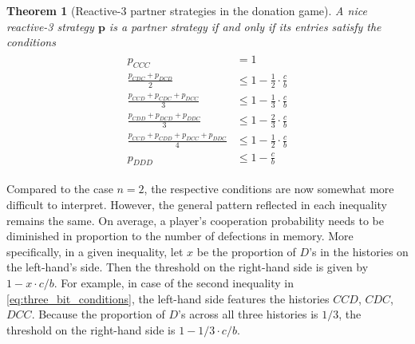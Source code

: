 \documentclass[9pt,twoside,lineno]{pnas-new}
\theoremstyle{plainCl1}
\newtheorem{theorem}{Theorem}
\newtheorem{corollary}{Corollary}
\theoremstyle{plainCl2}
\begin{document}
\begin{theorem}[Reactive-3 partner strategies in the donation game]\label{theorem:reactive_three_partner_strategies}
A nice reactive-3 strategy $\mathbf{p}$ is a partner strategy if and only if its entries satisfy the conditions
\begin{align}\label{eq:three_bit_conditions}
  \begin{split}
  p_{CCC} & = 1 \\
  \frac{p_{CDC} + p_{DCD}}{2} & \leq 1 - \frac{1}{2} \cdot \frac{c}{b} \\
  \frac{p_{CCD} + p_{CDC} + p_{DCC}}{3} & \leq 1 - \frac{1}{3} \cdot \frac{c}{b} \\
  \frac{p_{CDD} + p_{DCD} + p_{DDC}}{3} & \leq 1 - \frac{2}{3} \cdot \frac{c}{b} \\
  \frac{p_{CCD} + p_{CDD} + p_{DCC} + p_{DDC}}{4}  & \leq 1 - \frac{1}{2} \cdot \frac{c}{b}  \\
  p_{DDD} & \leq 1\!-\! \frac{c}{b}
  \end{split}
\end{align}
\end{theorem}

\noindent
Compared to the case $n\!=\!2$, the respective conditions are now somewhat more difficult to interpret. 
However, the general pattern reflected in each inequality remains the same. 
On average, a player's cooperation probability needs to be diminished in proportion to the number of defections in memory. 
More specifically, in a given inequality, let $x$ be the proportion of $D$'s in the histories on the left-hand's side. 
Then the threshold on the right-hand side is given by $1-x\cdot c/b$. 
For example, in case of the second inequality in \eqref{eq:three_bit_conditions}, the left-hand side features the histories $CCD$, $CDC$, $DCC$. 
Because the proportion of $D$'s across all three histories is $1/3$, the threshold on the right-hand side is $1-1/3\!\cdot\!c/b$. 

 

\end{document}
